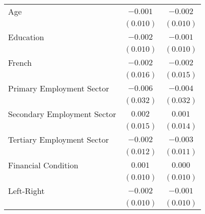 \begin{center}
\begin{tiny}
\begin{longtable}{l@{} c@{} c@{}}
\quad Age                                                                            & $-0.001$         & $-0.002$         \\
                                                                                     & $(0.010)$        & $(0.010)$        \\
\quad Education                                                                      & $-0.002$         & $-0.001$         \\
                                                                                     & $(0.010)$        & $(0.010)$        \\
\quad French                                                                         & $-0.002$         & $-0.002$         \\
                                                                                     & $(0.016)$        & $(0.015)$        \\
\quad Primary Employment Sector                                                      & $-0.006$         & $-0.004$         \\
                                                                                     & $(0.032)$        & $(0.032)$        \\
\quad Secondary Employment Sector                                                    & $0.002$          & $0.001$          \\
                                                                                     & $(0.015)$        & $(0.014)$        \\
\quad Tertiary Employment Sector                                                     & $-0.002$         & $-0.003$         \\
                                                                                     & $(0.012)$        & $(0.011)$        \\
\quad Financial Condition                                                            & $0.001$          & $0.000$          \\
                                                                                     & $(0.010)$        & $(0.010)$        \\
\quad Left-Right                                                                     & $-0.002$         & $-0.001$         \\
                                                                                     & $(0.010)$        & $(0.010)$        \\

\end{longtable}
\end{tiny}
\end{center}
